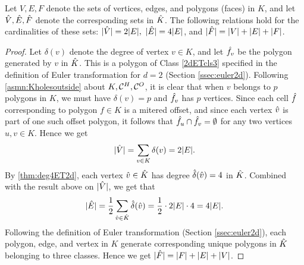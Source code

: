 \begin{lem}
  \label{lem:cntshVhEhF2d}
  Let $V, E, F$ denote the sets of vertices, edges, and polygons (faces) in $K$, and let $\hat{V}, \hat{E}, \hat{F}$ denote the corresponding sets in $\hat{K}$.
  The following relations hold for the cardinalities of these sets: $|\hat{V}| = 2|E|,~|\hat{E}| = 4|E|$, and $|\hat{F}| = |V| + |E| + |F|$.
\end{lem}

\begin{proof}
  Let $\delta(v)$ denote the degree of vertex $v \in K$, and let $\hat{f}_v$ be the polygon generated by $v$ in $\hat{K}$.
  This is a polygon of Class \ref{2dETcls3} specified in the definition of Euler transformation for $d=2$ (Section \ref{ssec:euler2d}).
  Following \cref{asmn:Kholesoutside} about $K, \mathcal{C}^H, \mathcal{C}^O$, it is clear that when $v$ belongs to $p$ polygons in $K$, we must have $\delta(v)=p$ and $\hat{f}_v$ has $p$ vertices.
  Since each cell $\hat{f}$ corresponding to polygon $f \in K$ is a mitered offset, and since each vertex $\hat{v}$ is part of one such offset polygon, it follows that $\hat{f}_u \cap \hat{f}_v = \emptyset$ for any two vertices $u,v \in K$.
  Hence we get
  \[
    |\hat{V}| = \sum_{v \in K} \delta(v) = 2|E|.
  \]
  By \cref{thm:deg4ET2d}, each vertex $\hat{v} \in \hat{K}$ has degree $\hat{\delta}(\hat{v}) = 4$ in $\hat{K}$.
  Combined with the result above on $|\hat{V}|$, we get that
  \[
    |\hat{E}| = \frac{1}{2} \sum_{\hat{v} \in \hat{K}} \hat{\delta}(\hat{v}) = \frac{1}{2} \cdot 2|E| \cdot 4 = 4|E|.
  \]
  Following the definition of Euler transformation (Section \ref{ssec:euler2d}), each polygon, edge, and vertex in $K$ generate corresponding unique polygons in $\hat{K}$ belonging to three classes.
  Hence we get $|\hat{F}| = |F| + |E| + |V|$.
\end{proof}


